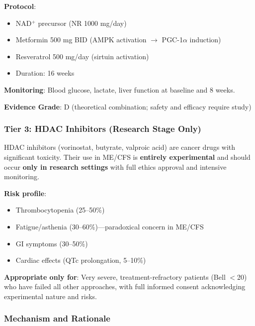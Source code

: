 \textbf{Protocol}:
\begin{itemize}
    \item NAD$^+$ precursor (NR 1000 mg/day)
    \item Metformin 500 mg BID (AMPK activation $\rightarrow$ PGC-1$\alpha$ induction)
    \item Resveratrol 500 mg/day (sirtuin activation)
    \item Duration: 16 weeks
\end{itemize}

\textbf{Monitoring}: Blood glucose, lactate, liver function at baseline and 8 weeks.

\textbf{Evidence Grade}: D (theoretical combination; safety and efficacy require study)

\subsubsection{Tier 3: HDAC Inhibitors (Research Stage Only)}

\begin{warning}
HDAC inhibitors (vorinostat, butyrate, valproic acid) are cancer drugs with significant toxicity. Their use in ME/CFS is \textbf{entirely experimental} and should occur \textbf{only in research settings} with full ethics approval and intensive monitoring.

\textbf{Risk profile}:
\begin{itemize}
    \item Thrombocytopenia (25--50\%)
    \item Fatigue/asthenia (30--60\%)---paradoxical concern in ME/CFS
    \item GI symptoms (30--50\%)
    \item Cardiac effects (QTc prolongation, 5--10\%)
\end{itemize}

\textbf{Appropriate only for}: Very severe, treatment-refractory patients (Bell $<$20) who have failed all other approaches, with full informed consent acknowledging experimental nature and risks.
\end{warning}

\subsubsection{Mechanism and Rationale}

